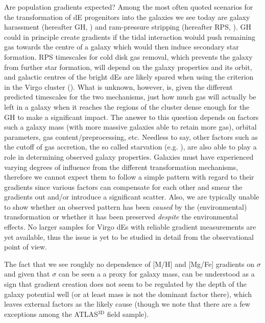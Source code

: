 \documentclass[useAMS,usenatbib]{mn2e}
\newcommand{\sig}{$\sigma$}
\newcommand{\atlas}{ATLAS$^{\mathrm{3D}}$}
\begin{document}
Are population gradients expected? Among the most often quoted scenarios for the transformation of dE progenitors into the galaxies we see today are galaxy harassment (hereafter GH, \citealt{moore:1998}) and ram-pressure stripping (hereafter RPS, \citealt{gunn:1972}). GH could in principle create gradients if the tidal interaction woiuld push remaining gas towards the centre of a galaxy which would then induce secondary star formation. RPS timescales for cold disk gas removal, which prevents the galaxy from further star formation, will depend on the galaxy properties and its orbit, and galactic centres of the bright dEs are likely spared when using the \citeauthor{gunn:1972} criterion in the Virgo cluster (\citealt{lisker:2013}). What is unknown, however, is, given the different predicted timescales for the two mechanisms, just how much gas will actually be left in a galaxy when it reaches the regions of the cluster dense enough for the GH to make a significant impact. The answer to this question depends on factors such a galaxy mass (with more massive galaxies able to retain more gas), orbital parameters, gas content/preprocessing, etc. Needless to say, other factors such as the cutoff of gas accretion, the so called starvation (e.g. \citealt{larson:1980}), are also able to play a role in determining observed galaxy properties. Galaxies must have experienced varying degrees of influence from the different transformation mechanisms, therefore we cannot expect them to follow a simple pattern with regard to their gradients since various factors can compensate for each other and smear the gradients out and/or introduce a significant scatter. Also, we are typically unable to show whether an observed pattern has been \textit{caused} by the (environmental) transformation or whether it has been preserved \textit{despite} the environmental effects. No larger samples for Virgo dEs with reliable gradient measurements are yet available, thus the issue is yet to be studied in detail from the observational point of view.

The fact that we see roughly no dependence of [M/H] and [Mg/Fe] gradients on {\sig} and given that {\sig} can be seen a a proxy for galaxy mass, can be understood as a sign that gradient creation does not seem to be regulated by the depth of the galaxy potential well (or at least mass is not the dominant factor there), which leaves external factors as the likely cause (though we note that there are a few exceptions among the {\atlas} field sample).
\end{document}

